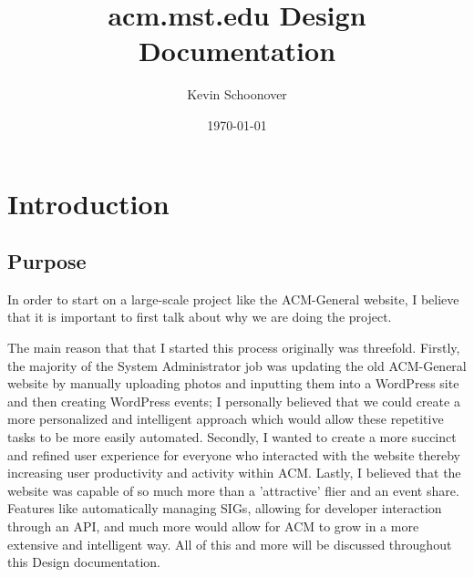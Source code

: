 \documentclass{article}
\title{acm.mst.edu Design Documentation}
\author{Kevin Schoonover}
\date{\today}
\begin{document}
\maketitle

\tableofcontents

\section{Introduction}
\subsection{Purpose}
In order to start on a large-scale project like the ACM-General website, I
believe that it is important to first talk about why we are doing the project.

The main reason that that I started this process originally was threefold.
Firstly, the majority of the System Administrator job was updating
the old ACM-General website by manually uploading photos and inputting them into
a WordPress site and then creating WordPress events; I personally believed that we
could create a more personalized and intelligent approach which would allow these
repetitive tasks to be more easily automated. Secondly, I wanted to create a
more succinct and refined user experience for everyone who interacted with the
website thereby increasing user productivity and activity within ACM.
Lastly, I believed that the website was capable of so much more than a
'attractive' flier and an event share. Features like automatically managing SIGs,
allowing for developer interaction through an API, and much more would allow
for ACM to grow in a more extensive and intelligent way. All of this and
more will be discussed throughout this Design documentation.
\end{document}
